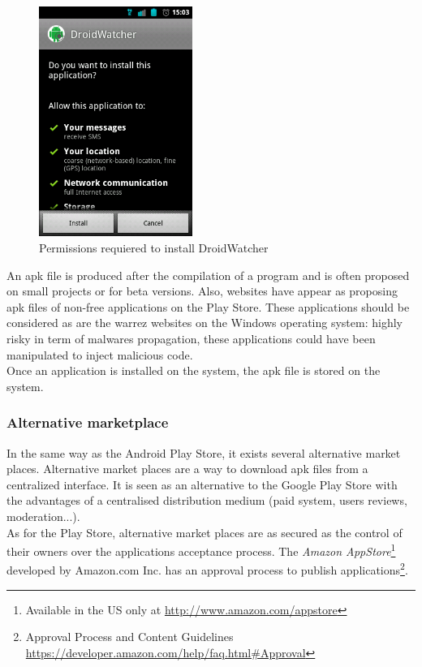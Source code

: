 \begin{figure}[h]
  \centering
  \includegraphics[width=5cm]{images/permissions.png}
  \caption{Permissions requiered to install DroidWatcher}
  \label{fig:perm-dw}
\end{figure}

An apk file is produced after the compilation of a program and is often proposed on small projects or for beta versions.
Also, websites have appear as proposing apk files of non-free applications on the Play Store.
These applications should be considered as are the warrez websites on the Windows operating system: highly risky in term of malwares propagation, these applications could have been manipulated to inject malicious code.\\

Once an application is installed on the system, the apk file is stored on the system.

\subsubsection{Alternative marketplace}
In the same way as the Android Play Store, it exists several alternative market places.
Alternative market places are a way to download apk files from a centralized interface.
It is seen as an alternative to the Google Play Store with the advantages of a centralised distribution medium (paid system, users reviews, moderation...).\\

As for the Play Store, alternative market places are as secured as the control of their owners over the applications acceptance process.
The \emph{Amazon AppStore}\footnote{Available in the US only at \url{http://www.amazon.com/appstore}} developed by Amazon.com Inc. has an approval process to publish applications\footnote{Approval Process and Content Guidelines \url{https://developer.amazon.com/help/faq.html#Approval}}.


